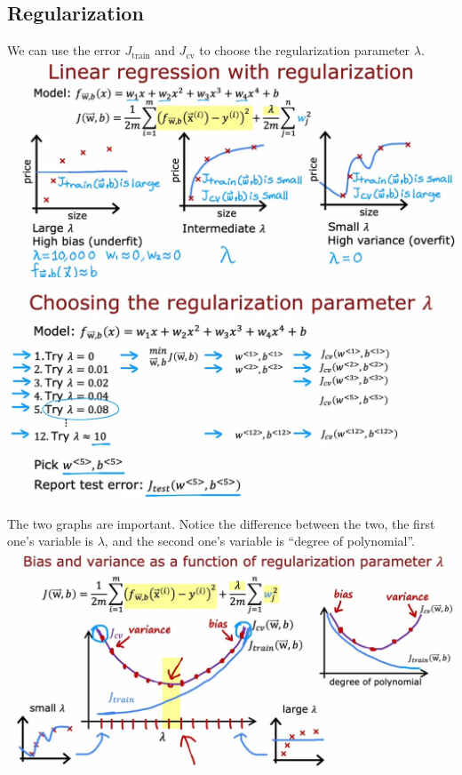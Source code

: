 \subsection*{Regularization}
We can use the error $J_{\text{train}}$ and $J_{\text{cv}}$ to choose the regularization 
parameter $\lambda$.\\
\includegraphics*[width=\textwidth]{images/10.9}
\includegraphics*[width=\textwidth]{images/10.10}
\par
The two graphs are important.
Notice the difference between the two, the first one's variable is $\lambda$, 
and the second one's variable is ``degree of polynomial''.\\
\includegraphics*[width=\textwidth]{images/10.11}
